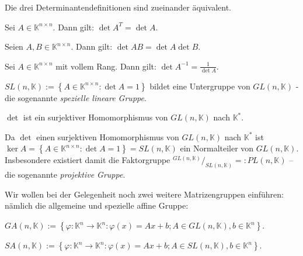 \documentclass[10pt]{scrbook}
\begin{document}
\begin{Sa}
Die drei Determinantendefinitionen sind zueinander äquivalent.
\end{Sa}

\begin{Le}
Sei $A\in \mathbb{K}^{n\times n}$. Dann gilt:
$\det A^T=\det A$.
\end{Le}

\begin{Sa}
Seien $A, B\in \mathbb{K}^{n\times n}$. Dann gilt:
$\det A B=\det A \det B$.
\end{Sa}

\begin{Kor}
Sei $A\in \mathbb{K}^{n\times n}$ mit vollem Rang. Dann gilt:
$\det A^{-1}=\frac{1}{\det A}$.
\end{Kor}

\begin{Kor}
$SL(n, \mathbb{K}):=\left\{A\in\mathbb{K}^{n\times n}: \det A=1\right\}$ bildet eine Untergruppe von $GL(n, \mathbb{K})$ - die sogenannte \emph{spezielle lineare Gruppe}.
\end{Kor}

\begin{Kor}
$\det$ ist ein surjektiver Homomorphismus von $GL(n, \mathbb{K})$ nach $\mathbb{K}^*$.
\end{Kor}

\begin{Kor}
Da $\det$ einen surjektiven Homomorphismus von $GL(n, \mathbb{K})$ nach $\mathbb{K}^*$ ist $\ker A=\left\{A\in\mathbb{K}^{n\times n}: \det A=1\right\}=SL(n, \mathbb{K})$ ein Normalteiler von $GL(n, \mathbb{K})$. Insbesondere existiert damit die Faktorgruppe $^{GL(n, \mathbb{K})}/_{SL(n, \mathbb{K})}=:PL(n, \mathbb{K})$ -- die sogenannte \emph{projektive Gruppe}.
\end{Kor}

Wir wollen bei der Gelegenheit noch zwei weitere Matrizengruppen einführen: nämlich die allgemeine und spezielle affine Gruppe:

\begin{Def}
$GA(n, \mathbb{K}):=\left\{\varphi: \mathbb{K}^n\rightarrow \mathbb{K}^n: \varphi(x)=A x+b; A\in GL(n, \mathbb{K}), b\in \mathbb{K}^n\right\}$.
\end{Def}

\begin{Def}
$SA(n, \mathbb{K}):=\left\{\varphi: \mathbb{K}^n\rightarrow \mathbb{K}^n: \varphi(x)=A x+b; A\in SL(n, \mathbb{K}), b\in \mathbb{K}^n\right\}$.
\end{Def}
\end{document}
